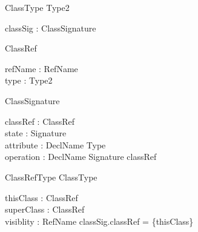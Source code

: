 \begin{sidebyside}
\begin{class}{ClassType}
  Type2\\
\begin{state}
  classSig : ClassSignature
\end{state}
\end{class}
\nextside
\begin{class}{ClassRef}
\begin{state}
  refName : RefName\\
  type : \seq Type2
\end{state}
\end{class}
\end{sidebyside}
\begin{sidebyside}
\begin{class}{ClassSignature}
\begin{state}
  classRef : \finset ClassRef\\
  state : Signature\\
  attribute : DeclName \pfun Type\\
  operation : DeclName \pfun Signature
\where
  classRef \neq \emptyset
\end{state}
\end{class}
\nextside
\begin{class}{ClassRefType}
  ClassType\\
\begin{state}
  thisClass : ClassRef\\
  superClass : \finset ClassRef\\
  visiblity : \finset RefName
\where
  classSig.classRef = \{thisClass\}
\end{state}  
\end{class}
\end{sidebyside}

